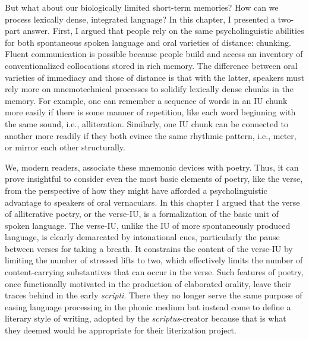But what about our biologically limited short-term memories? How can we process lexically dense, integrated language? In this chapter, I presented a two-part answer. First, I argued that people rely on the same psycholinguistic abilities for both spontaneous spoken language and oral varieties of distance: chunking. Fluent communication is possible because people build and access an inventory of conventionalized collocations stored in rich memory. The difference between oral varieties of immediacy and those of distance is that with the latter, speakers must rely more on mnemotechnical processes to solidify lexically dense chunks in the memory. For example, one can remember a sequence of words in an IU chunk more easily if there is some manner of repetition, like each word beginning with the same sound, i.e., alliteration. Similarly, one IU chunk can be connected to another more readily if they both evince the same rhythmic pattern, i.e., meter, or mirror each other structurally.

We, modern readers, associate these mnemonic devices with poetry. Thus, it can prove insightful to consider even the most basic elements of poetry, like the verse, from the perspective of how they might have afforded a psycholinguistic advantage to speakers of oral vernaculars. In this chapter I argued that the verse of alliterative poetry, or the verse-IU, is a formalization of the basic unit of spoken language. The verse-IU, unlike the IU of more spontaneously produced language, is clearly demarcated by intonational cues, particularly the pause between verses for taking a breath. It constrains the content of the verse-IU by limiting the number of stressed lifts to two, which effectively limits the number of content-carrying substantives that can occur in the verse. Such features of poetry, once functionally motivated in the production of elaborated orality, leave their traces behind in the early \textit{scripti}. There they no longer serve the same purpose of easing language processing in the phonic medium but instead come to define a literary style of writing, adopted by the \textit{scriptus}{}-creator because that is what they deemed would be appropriate for their literization project.

